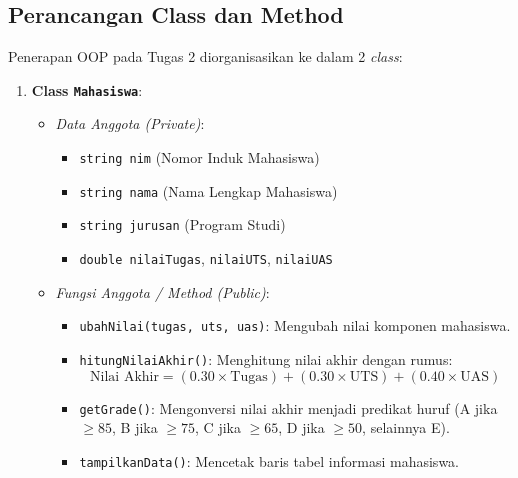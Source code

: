 \documentclass[12pt,a4paper]{article}
\begin{document}
\subsection{Perancangan Class dan Method}
Penerapan OOP pada Tugas 2 diorganisasikan ke dalam 2 \textit{class}:
\begin{enumerate}
    \item \textbf{Class \texttt{Mahasiswa}}:
    \begin{itemize}
        \item \textit{Data Anggota (Private)}:
        \begin{itemize}
            \item \texttt{string nim} (Nomor Induk Mahasiswa)
            \item \texttt{string nama} (Nama Lengkap Mahasiswa)
            \item \texttt{string jurusan} (Program Studi)
            \item \texttt{double nilaiTugas}, \texttt{nilaiUTS}, \texttt{nilaiUAS}
        \end{itemize}
        \item \textit{Fungsi Anggota / Method (Public)}:
        \begin{itemize}
            \item \texttt{ubahNilai(tugas, uts, uas)}: Mengubah nilai komponen mahasiswa.
            \item \texttt{hitungNilaiAkhir()}: Menghitung nilai akhir dengan rumus:
            \[
            \text{Nilai Akhir} = (0.30 \times \text{Tugas}) + (0.30 \times \text{UTS}) + (0.40 \times \text{UAS})
            \]
            \item \texttt{getGrade()}: Mengonversi nilai akhir menjadi predikat huruf (A jika $\ge 85$, B jika $\ge 75$, C jika $\ge 65$, D jika $\ge 50$, selainnya E).
            \item \texttt{tampilkanData()}: Mencetak baris tabel informasi mahasiswa.
        \end{itemize}
    \end{itemize}


\end{enumerate}
\end{document}
